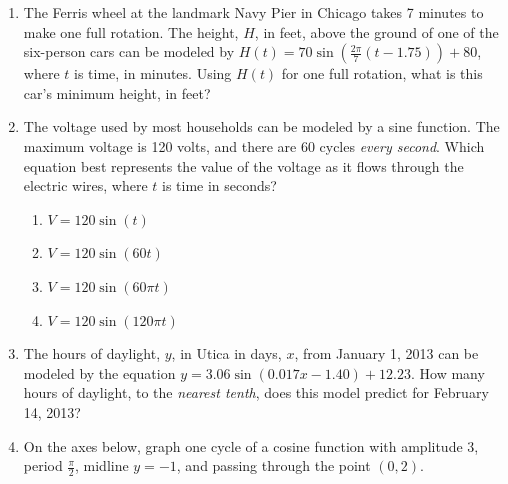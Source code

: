 \documentclass[12pt, oneside]{article}
\begin{document}
\begin{enumerate}
\item The Ferris wheel at the landmark Navy Pier in Chicago takes 7 minutes to make one full rotation. The height, $H$, in feet, above the ground of one of the six-person cars can be modeled by $\displaystyle H(t)=70 \sin{\left( \frac{2 \pi}{7}(t-1.75) \right) +80}$, where $t$ is time, in minutes. Using $H(t)$ for one full rotation, what is this car’s minimum height, in feet? %

\item The voltage used by most households can be modeled by a sine function. The maximum voltage is 120 volts, and there are 60 cycles \emph{every second}. Which equation best represents the value of the voltage as it flows through the electric wires, where $t$ is time in seconds?
\begin{enumerate}
    \item $V=120 \sin{(t)}$
    \item $V=120 \sin{(60t)}$
    \item $V=120 \sin{(60 \pi t)}$
    \item $V=120 \sin{(120 \pi t)}$
\end{enumerate} %

\item The hours of daylight, $y$, in Utica in days, $x$, from January 1, 2013 can be modeled by the equation $y = 3.06 \sin(0.017x-1.40) +12.23$. How many hours of daylight, to the \emph{nearest tenth}, does this model predict for February 14, 2013?

\item On the axes below, graph one cycle of a cosine function with amplitude 3, period $\displaystyle \frac{\pi}{2}$, midline $y=-1$, and passing through the point $(0,2)$.
\begin{center}
\end{center} %


\end{enumerate}
\end{document}
